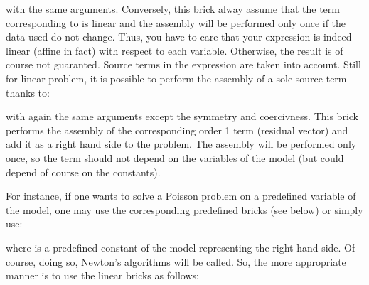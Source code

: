 \documentclass[a4paper,11pt,english]{sphinxmanual}
\begin{document}
with the same arguments. Conversely, this brick alway assume that the term corresponding to  is linear and the assembly will be performed only once if the data used do not change. Thus, you have to care that your expression is indeed linear (affine in fact) with respect to each variable. Otherwise, the result is of course not guaranted. Source terms in the expression are taken into account. Still for linear problem, it is possible to perform the assembly of a sole source term thanks to:

\begin{sphinxVerbatim}[commandchars=\\\{\}]
      
\end{sphinxVerbatim}

with again the same arguments except the symmetry and coercivness. This brick performs the assembly of the corresponding order 1 term (residual vector) and add it as a right hand side to the problem. The assembly will be performed only once, so the term should not depend on the variables of the model (but could depend of course on the constants).

For instance, if one wants to solve a Poisson problem on a predefined variable  of the model, one may use the corresponding pre\sphinxhyphen{}defined bricks (see below) or simply use:

\begin{sphinxVerbatim}[commandchars=\\\{\}]
     
\end{sphinxVerbatim}

where  is a pre\sphinxhyphen{}defined constant of the model representing the right hand side. Of course, doing so, Newton’s algorithms will be called. So, the more appropriate manner is to use the linear bricks as follows:

\begin{sphinxVerbatim}[commandchars=\\\{\}]
     
  
\end{sphinxVerbatim}
\end{document}
